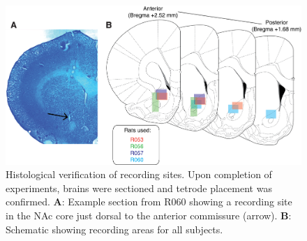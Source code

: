 \documentclass[11pt]{article}
\newcommand{\bsf}[1]{\textbf{#1}}
\begin{document}
 \begin{figure}[ht!]
\centering
\includegraphics[width=\textwidth]{Fig 10 - Histology.png}
\caption{Histological verification of recording sites. Upon completion of
  experiments, brains were sectioned and tetrode placement was
  confirmed. \bsf{A}: Example section from R060 showing a recording site in the
  NAc core just dorsal to the anterior commissure (arrow). \bsf{B}:
  Schematic showing recording areas for all subjects.}
\label{fig:histo}
\end{figure} \clearpage


\end{document}
